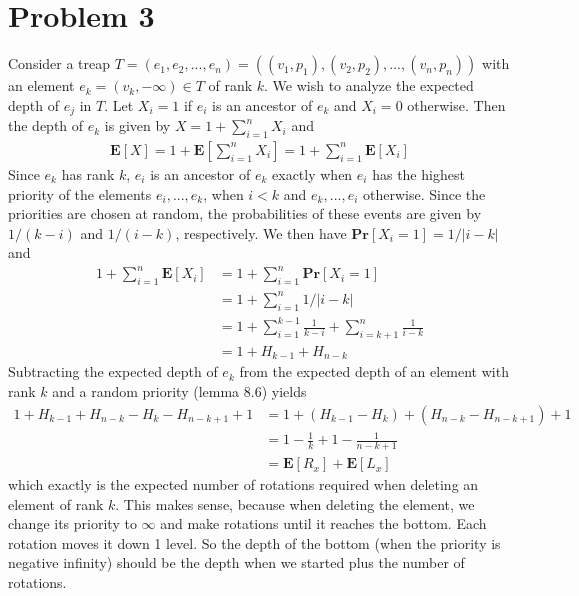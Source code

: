 \documentclass[12pt]{article}
\begin{document}
\section*{Problem 3}
Consider a treap $T=(e_1, e_2, ..., e_n) = ((v_1,p_1), (v_2,p_2), ..., (v_n,p_n))$ with an element $e_k = (v_k, -\infty) \in T$ of rank $k$. We wish to analyze the expected depth of $e_j$ in $T$. Let $X_i = 1$ if $e_i$ is an ancestor of $e_k$ and $X_i=0$ otherwise. Then the depth of $e_k$ is given by $X=1 + \sum_{i=1}^{n}X_i$ and
\begin{align*}
\mathbf{E}\left[ X \right] = 1 + \mathbf{E}\left[ \sum\limits_{i=1}^{n}X_i \right] = 1 + \sum\limits_{i=1}^{n}\mathbf{E}\left[X_i \right] 
\end{align*}
Since $e_k$ has rank $k$, $e_i$ is an ancestor of $e_k$ exactly when $e_i$ has the highest priority of the elements $e_i, ..., e_k$, when $i < k$ and $e_k, ..., e_i$ otherwise. Since the priorities are chosen at random, the probabilities of these events are given by $1/(k-i)$ and $1/(i-k)$, respectively. We then have $\mathbf{Pr}\left[ X_i = 1 \right] = 1 / |i-k|$ and
\begin{align*}
1 + \sum\limits_{i=1}^{n}\mathbf{E}\left[X_i \right] &= 1 + \sum\limits_{i=1}^{n}\mathbf{Pr}\left[X_i = 1 \right] \\
&= 1 + \sum\limits_{i=1}^{n} 1 / |i-k| \\
&= 1 +\sum\limits_{i=1}^{k-1} \frac{1}{k-i} + \sum\limits_{i=k+1}^{n} \frac{1}{i-k} \\
&= 1 +H_{k-1} + H_{n-k}
\end{align*}
Subtracting the expected depth of $e_k$ from the expected depth of an element with rank $k$ and a random priority (lemma 8.6) yields
\begin{align*}
1 + H_{k-1} + H_{n-k} - H_k - H_{n-k+1} + 1 &= 1 + (H_{k-1} - H_k) + (H_{n-k} - H_{n-k+1}) + 1 \\
&= 1 -\frac{1}{k} +1 - \frac{1}{n-k+1} \\
&= \mathbf{E}\left[ R_x \right] + \mathbf{E}\left[ L_x \right]
\end{align*}
which exactly is the expected number of rotations required when deleting an element of rank $k$. This makes sense, because when deleting the element, we change its priority to $\infty$ and make rotations until it reaches the bottom. Each rotation moves it down 1 level. So the depth of the bottom (when the priority is negative infinity) should be the depth when we started plus the number of rotations.
\end{document}
